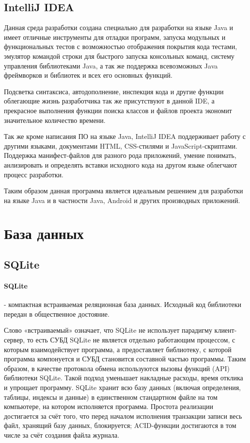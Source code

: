 \subsection{IntelliJ IDEA}

Данная среда разработки создана специально для разработки на языке Java и имеет отличные инструменты для отладки программ, запуска модульных и функциональных тестов с возможностью отображения покрытия кода тестами, эмулятор командой строки для быстрого запуска консольных команд, систему управления библиотеками Java, а так же поддержка всевозможных Java фреймворков и библиотек и всех его основных функций. 

Подсветка синтаксиса, автодополнение, инспекция кода и другие функции облегающие жизнь разработчика так же присутствуют в данной IDE, а прекрасное выполнения функции поиска классов и файлов проекта экономит значительное количество времени.

Так же кроме написания ПО на языке Java, IntelliJ IDEA поддерживает работу с другими языками, документами HTML, CSS-стилями и JavaScript-скриптами. Поддержка манифест-файлов для разного рода приложений, умение понимать, анлизировать и определять вставки исходного кода на другом языке облегчают процесс разработки.

Таким образом данная программа является идеальным решением для разработки на языке Java и в частности Java, Android и других производных приложений.

\section{База данных}
\subsection{SQLite}
\paragraph{SQLite} - компактная встраиваемая реляционная база данных. Исходный код библиотеки передан в общественное достояние.

Слово «встраиваемый» означает, что SQLite не использует парадигму клиент-сервер, то есть СУБД SQLite не является отдельно работающим процессом, с которым взаимодействует программа, а предоставляет библиотеку, с которой программа компонуется и СУБД становится составной частью программы. Таким образом, в качестве протокола обмена используются вызовы функций (API) библиотеки SQLite. Такой подход уменьшает накладные расходы, время отклика и упрощает программу. SQLite хранит всю базу данных (включая определения, таблицы, индексы и данные) в единственном стандартном файле на том компьютере, на котором исполняется программа. Простота реализации достигается за счёт того, что перед началом исполнения транзакции записи весь файл, хранящий базу данных, блокируется; ACID-функции достигаются в том числе за счёт создания файла журнала.

